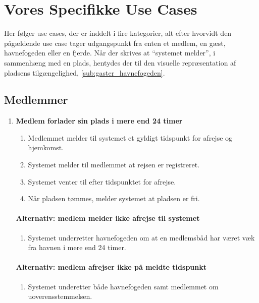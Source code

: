 \section{Vores Specifikke Use Cases}
Her følger use cases, der er inddelt i fire kategorier, alt efter hvorvidt den pågældende use case tager udgangspunkt fra enten et medlem, en gæst, havnefogeden eller en fjerde. Når der skrives at \enquote{systemet melder}, i sammenhæng med en plads, hentydes der til den visuelle repræsentation af pladsens tilgængelighed, \cref{sub:gaster_havnefogeden}.

\subsection{Medlemmer}  
  \begin{enumerate}

    \item{\bf{Medlem forlader sin plads i mere end 24 timer}}
      \begin{enumerate}
        \item Medlemmet melder til systemet et gyldigt tidspunkt for afrejse og hjemkomst.
        \item Systemet melder til medlemmet at rejsen er registreret.
        \item Systemet venter til efter tidspunktet for afrejse.
        \item Når pladsen tømmes, melder systemet at pladsen er fri.
      \end{enumerate}

    \paragraph{Alternativ: medlem melder ikke afrejse til systemet}
      \begin{enumerate}
        \item Systemet underretter havnefogeden om at en medlemsbåd har været væk fra havnen i mere end 24 timer.
      \end{enumerate}

    \paragraph{Alternativ: medlem afrejser ikke på meldte tidspunkt}
      \begin{enumerate}
        \item Systemet underetter både havnefogeden samt medlemmet om uoverensstemmelsen.
      \end{enumerate}



\end{enumerate}
